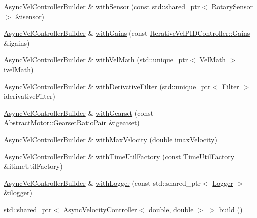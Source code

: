 \begin{DoxyCompactItemize}
\item 
\mbox{\hyperlink{classokapi_1_1AsyncVelControllerBuilder}{Async\+Vel\+Controller\+Builder}} \& \mbox{\hyperlink{classokapi_1_1AsyncVelControllerBuilder_a4bfe71bea3ec45c6b10ec66047b06c4c}{with\+Sensor}} (const std\+::shared\+\_\+ptr$<$ \mbox{\hyperlink{classokapi_1_1RotarySensor}{Rotary\+Sensor}} $>$ \&isensor)
\item 
\mbox{\hyperlink{classokapi_1_1AsyncVelControllerBuilder}{Async\+Vel\+Controller\+Builder}} \& \mbox{\hyperlink{classokapi_1_1AsyncVelControllerBuilder_af919e427baf0c06790895f5cb9ce333d}{with\+Gains}} (const \mbox{\hyperlink{structokapi_1_1IterativeVelPIDController_1_1Gains}{Iterative\+Vel\+P\+I\+D\+Controller\+::\+Gains}} \&igains)
\item 
\mbox{\hyperlink{classokapi_1_1AsyncVelControllerBuilder}{Async\+Vel\+Controller\+Builder}} \& \mbox{\hyperlink{classokapi_1_1AsyncVelControllerBuilder_aa385c0ae6f8464955a950465b7cff1b6}{with\+Vel\+Math}} (std\+::unique\+\_\+ptr$<$ \mbox{\hyperlink{classokapi_1_1VelMath}{Vel\+Math}} $>$ ivel\+Math)
\item 
\mbox{\hyperlink{classokapi_1_1AsyncVelControllerBuilder}{Async\+Vel\+Controller\+Builder}} \& \mbox{\hyperlink{classokapi_1_1AsyncVelControllerBuilder_ae3d54b49f57ed29410013d112f6141cc}{with\+Derivative\+Filter}} (std\+::unique\+\_\+ptr$<$ \mbox{\hyperlink{classokapi_1_1Filter}{Filter}} $>$ iderivative\+Filter)
\item 
\mbox{\hyperlink{classokapi_1_1AsyncVelControllerBuilder}{Async\+Vel\+Controller\+Builder}} \& \mbox{\hyperlink{classokapi_1_1AsyncVelControllerBuilder_a128d0a52035c576258bc3ca10958c45f}{with\+Gearset}} (const \mbox{\hyperlink{structokapi_1_1AbstractMotor_1_1GearsetRatioPair}{Abstract\+Motor\+::\+Gearset\+Ratio\+Pair}} \&igearset)
\item 
\mbox{\hyperlink{classokapi_1_1AsyncVelControllerBuilder}{Async\+Vel\+Controller\+Builder}} \& \mbox{\hyperlink{classokapi_1_1AsyncVelControllerBuilder_a7e4651e36c2a2dffa425a95c70bdd703}{with\+Max\+Velocity}} (double imax\+Velocity)
\item 
\mbox{\hyperlink{classokapi_1_1AsyncVelControllerBuilder}{Async\+Vel\+Controller\+Builder}} \& \mbox{\hyperlink{classokapi_1_1AsyncVelControllerBuilder_a4996a83333f1affdd0b77054ece7d07d}{with\+Time\+Util\+Factory}} (const \mbox{\hyperlink{classokapi_1_1TimeUtilFactory}{Time\+Util\+Factory}} \&itime\+Util\+Factory)
\item 
\mbox{\hyperlink{classokapi_1_1AsyncVelControllerBuilder}{Async\+Vel\+Controller\+Builder}} \& \mbox{\hyperlink{classokapi_1_1AsyncVelControllerBuilder_a39fc6798e638b770cd10674bfebbb844}{with\+Logger}} (const std\+::shared\+\_\+ptr$<$ \mbox{\hyperlink{classokapi_1_1Logger}{Logger}} $>$ \&ilogger)
\item 
std\+::shared\+\_\+ptr$<$ \mbox{\hyperlink{classokapi_1_1AsyncVelocityController}{Async\+Velocity\+Controller}}$<$ double, double $>$ $>$ \mbox{\hyperlink{classokapi_1_1AsyncVelControllerBuilder_a23ecaa0969360f45c4f0266ff81fdb6d}{build}} ()
\end{DoxyCompactItemize}


